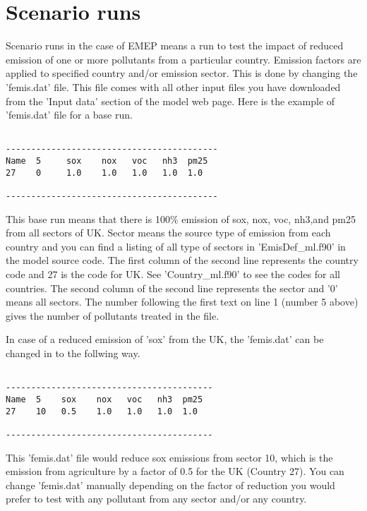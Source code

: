 \section{Scenario runs}

Scenario runs in the case of EMEP means a run to test the impact of reduced emission of
one or more pollutants from a particular country.  Emission factors
are applied to specified country and/or emission sector.  This is done by
changing the 'femis.dat' file. This file comes with all other input
files you have downloaded from the 'Input
data' section of the model web page.  Here is the example of 'femis.dat'
file for a base run. 

\begin{verbatim}

------------------------------------------
Name  5     sox    nox   voc   nh3  pm25
27    0     1.0    1.0   1.0   1.0  1.0  

------------------------------------------

\end{verbatim}

This base run means that there is 100\% emission of sox, nox, voc,
nh3,and pm25 from all sectors of UK.  Sector means the source type of
emission from each country and you can find a listing of all type of sectors
in 'EmisDef\_ml.f90' in the model source code.  The first column of the second
line represents the country code and 27 is the code for UK.  See
'Country\_ml.f90' to see the codes for all countries.  The second
column of the second line 
represents the sector and '0' means all sectors.  The number following
the first text on line 1 (number 5 above) gives the number of
pollutants treated in the file.   
              

In case of a reduced emission of 'sox' from the UK, the 'femis.dat' can be
changed in to the follwing way. 

\begin{verbatim}

-----------------------------------------
Name  5    sox    nox   voc   nh3  pm25 
27    10   0.5    1.0   1.0   1.0  1.0   

-----------------------------------------

\end{verbatim}        

This 'femis.dat' file would reduce sox emissions from sector 10, which
is the emission from  agriculture by a
factor of 0.5 for the UK (Country 27).  You can change 'femis.dat'
manually depending on the factor of
reduction you would prefer to test with any pollutant from any sector
and/or any country. 


